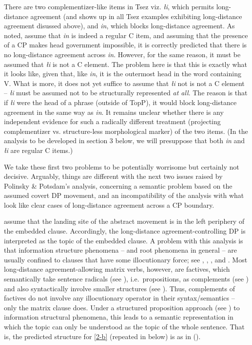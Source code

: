 \documentclass[output=paper
,modfonts
,nonflat]{langsci/langscibook}
\begin{document}
There are two comp\-lement\-izer-like items in Tsez viz. {\itshape {\l}i},
which permits long-distance agreement (and shows up in all Tsez
examples exhibiting long-distance agreement disussed above), and {\it
  \textcrlambda in}, which blocks long-distance agreement. As noted,
\cite{Polinsky&Potsdam:01} assume that {\itshape \textcrlambda in} is
indeed a regular C item, and assuming that the presence of a CP makes
head government impossible, it is correctly predicted that there is no
long-distance agreement across {\itshape \textcrlambda in}.
However,  for the same reason, it must be assumed that {\itshape {\l}i} is
not a C element. The problem here is that this is exactly what
it looks like, given that, like {\itshape \textcrlambda in}, it is the
outermost head in the word containing V. What is more, it does not yet suffice to
assume that  {\itshape {\l}i} not is not a C element -- {\itshape {\l}i} must  be
assumed not to be structurally represented {\itshape at all}. The reason is
that if {\itshape {\l}i} were the head of a phrase (outside of TopP), it would block
long-distance agreement in the same way as {\itshape \textcrlambda in}. 
It remains unclear whether there is any independent evidence for such
a radically different treatment (projecting complementizer
vs. structure-less morphological marker) of the two items. (In the
analysis to be developed in section 3 below, we will presuppose that
both  {\itshape \textcrlambda in} and {\itshape {\l}i} are regular C items.)

We take these first two problems to be potentially worrisome but
certainly not decisive. Arguably, things are different with the next
two issues raised by Polinsky \& Potsdam's analysis, concerning a
semantic problem based on the assumed covert DP movement, and an
incompatibility of the analysis with what look like clear cases of
long-distance agreement across a CP boundary.



\cite{Polinsky&Potsdam:01} assume that the landing site of the
abstract movement is in the left periphery of the embedded
clause. Accordingly, the long-distance agreement-controlling DP is
interpreted as the topic of the embedded clause. A problem with this
analysis is that information structure phenomena -- and root phenomena
in general -- are usually confined to clauses that have some
illocutionary force; see \cite{Hooper&Thompson:73},
    \cite{Ebertetal08}, \cite{Krifkainprep}, and \cite{Maticetal14}. Most long-distance agreement-allowing
matrix verbs, however, are factives, which semantically take sentence
radicals (see \cite{Stenius67}), i.e.~propositions, as complements (see \cite{Krifka04})
 and also syntactically involve smaller
structures (see \cite{deCubaUrogdi10}). Thus, complements of
factives do not involve any illocutionary operator in their
syntax/semantics -- only the matrix clause does. Under a structured
proposition approach  (see \cite{Krifka92}) to information structural
phenomena, this leads to a semantic representation in which the topic
can only be understood as the topic of the whole sentence. That is,
the predicted structure for \ref{2-b}  (repeated in
\Next below) is as in (\NNext).
\end{document}
